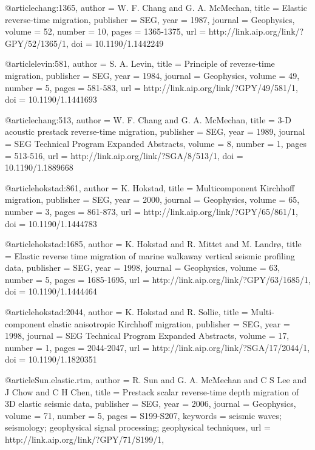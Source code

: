 @article{chang:1365,
  author =	 {W. F. Chang and G. A. McMechan},
  title =	 {Elastic reverse-time migration},
  publisher =	 {SEG},
  year =	 1987,
  journal =	 {Geophysics},
  volume =	 52,
  number =	 10,
  pages =	 {1365-1375},
  url =		 {http://link.aip.org/link/?GPY/52/1365/1},
  doi =		 {10.1190/1.1442249}
}

@article{levin:581,
  author =	 {S. A. Levin},
  title =	 {Principle of reverse-time migration},
  publisher =	 {SEG},
  year =	 1984,
  journal =	 {Geophysics},
  volume =	 49,
  number =	 5,
  pages =	 {581-583},
  url =		 {http://link.aip.org/link/?GPY/49/581/1},
  doi =		 {10.1190/1.1441693}
}

@article{chang:513,
  author =	 {W. F. Chang and G. A. McMechan},
  title =	 {3-{D} acoustic prestack reverse-time migration},
  publisher =	 {SEG},
  year =	 1989,
  journal =	 {SEG Technical Program Expanded Abstracts},
  volume =	 8,
  number =	 1,
  pages =	 {513-516},
  url =		 {http://link.aip.org/link/?SGA/8/513/1},
  doi =		 {10.1190/1.1889668}
}

@article{hokstad:861,
  author =	 {K. Hokstad},
  title =	 {Multicomponent {K}irchhoff migration},
  publisher =	 {SEG},
  year =	 2000,
  journal =	 {Geophysics},
  volume =	 65,
  number =	 3,
  pages =	 {861-873},
  url =		 {http://link.aip.org/link/?GPY/65/861/1},
  doi =		 {10.1190/1.1444783}
}

@article{hokstad:1685,
  author =	 {K. Hokstad and R. Mittet and M. Landr\o},
  title =	 {Elastic reverse time migration of marine walkaway
                  vertical seismic profiling data},
  publisher =	 {SEG},
  year =	 1998,
  journal =	 {Geophysics},
  volume =	 63,
  number =	 5,
  pages =	 {1685-1695},
  url =		 {http://link.aip.org/link/?GPY/63/1685/1},
  doi =		 {10.1190/1.1444464}
}

@article{hokstad:2044,
  author =	 {K. Hokstad and R. Sollie},
  title =	 {Multi-component elastic anisotropic {K}irchhoff
                  migration},
  publisher =	 {SEG},
  year =	 1998,
  journal =	 {SEG Technical Program Expanded Abstracts},
  volume =	 17,
  number =	 1,
  pages =	 {2044-2047},
  url =		 {http://link.aip.org/link/?SGA/17/2044/1},
  doi =		 {10.1190/1.1820351}
}

@article{Sun.elastic.rtm,
  author =	 {R. Sun and G. A. McMechan and C S Lee
                  and J Chow and C H Chen},
  title =	 {Prestack scalar reverse-time depth migration of {3D}
                  elastic seismic data},
  publisher =	 {SEG},
  year =	 2006,
  journal =	 {Geophysics},
  volume =	 71,
  number =	 5,
  pages =	 {S199-S207},
  keywords =	 {seismic waves; seismology; geophysical signal
                  processing; geophysical techniques},
  url =		 {http://link.aip.org/link/?GPY/71/S199/1},
}

